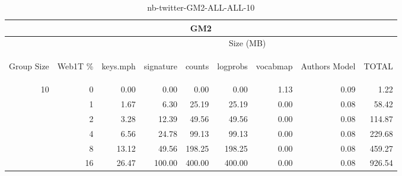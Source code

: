 \begin{center}
\begin{table}[htbp]
\begin{tabular}{ | r | r | r | r | r | r | r | r | r |}
\hline
\multicolumn{9}{|c|}{GM2}\\
\hline
 & & \multicolumn{7}{|c|}{Size (MB)}\\ \cline{3-9}
\begin{sideways}Group Size\end{sideways} & \begin{sideways}Web1T \% \end{sideways} & \begin{sideways}keys.mph\end{sideways} & \begin{sideways}signature\end{sideways} & \begin{sideways}counts\end{sideways} & \begin{sideways}logprobs\end{sideways} & \begin{sideways}vocabmap\end{sideways} & \begin{sideways}Authors Model \end{sideways} & \begin{sideways}TOTAL\end{sideways}\\
\hline
\multirow{5}{*}{10}
 & 0 & 0.00 & 0.00 & 0.00 & 0.00 & 1.13 & 0.09 & 1.22\\ \cline{2-9}
 & 1 & 1.67 & 6.30 & 25.19 & 25.19 & 0.00 & 0.08 & 58.42\\ \cline{2-9}
 & 2 & 3.28 & 12.39 & 49.56 & 49.56 & 0.00 & 0.08 & 114.87\\ \cline{2-9}
 & 4 & 6.56 & 24.78 & 99.13 & 99.13 & 0.00 & 0.08 & 229.68\\ \cline{2-9}
 & 8 & 13.12 & 49.56 & 198.25 & 198.25 & 0.00 & 0.08 & 459.27\\ \cline{2-9}
 & 16 & 26.47 & 100.00 & 400.00 & 400.00 & 0.00 & 0.08 & 926.54\\ \cline{2-9}
\hline
\end{tabular}
\caption{nb-twitter-GM2-ALL-ALL-10}
\label{table:nb-twitter-GM2-ALL-ALL-10}
\end{table}
\end{center}

